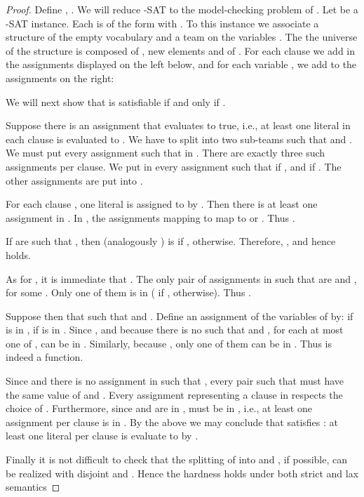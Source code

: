\documentclass{article}
\theoremstyle{plain}
\theoremstyle{definition}
\begin{document}
\begin{proof}
Define , . We will reduce  -SAT to the  model-checking problem  of . Let  be  a -SAT instance. 
 Each  is of the form  with  . To this instance we associate a structure  of the empty vocabulary and a team  on the variables . The the universe of the structure  is composed of ,  new elements  and of . For each clause  we add  in  the  assignments displayed on the left below,  and for each variable ,  we add to  the  assignments on the right:

We will next show that  is satisfiable if and only if .



Suppose there is an assignment   that evaluates   to true, i.e., at least one literal in each clause is evaluated to . We have to split  into two sub-teams  such that  and . We must put every assignment  such that  in . There are exactly three such assignments per clause. We put in  every assignment  such that  if , and  if . The other assignments are put into .
	
	For each clause , one literal  is assigned to  by . Then there is at least one assignment  in . In , the  assignments mapping  to  map  to  or . Thus . 
	
	If   are such that , then  (analogously ) is  if ,  otherwise.  Therefore, , and hence   holds.
	
	As for , it is immediate that . The only pair of assignments  in  such that  are  and , for some . Only one of them is in  ( if ,  otherwise). Thus .
	


Suppose then that  such that  and . Define an assignment   of the variables of  by:  if  is in ,  if  is in . Since ,  and because there is no  such that  and , for each  at most one of ,  can be in . Similarly, because , only one of them can be in . Thus  is indeed a function.

Since  and there is no assignment in  such that , every pair  such that  must have the same value of  and . Every assignment representing a clause in  respects the choice of . Furthermore, since  and  are in ,  must be in , i.e., at least one assignment per clause is in . By the above we may conclude that  satisfies : at least one literal per clause is evaluate to  by .


Finally it is not difficult to check that  the splitting of  into  and , if possible, can be  realized with disjoint  and . Hence the hardness holds  under both strict and lax semantics 

\end{proof}
\end{document}
